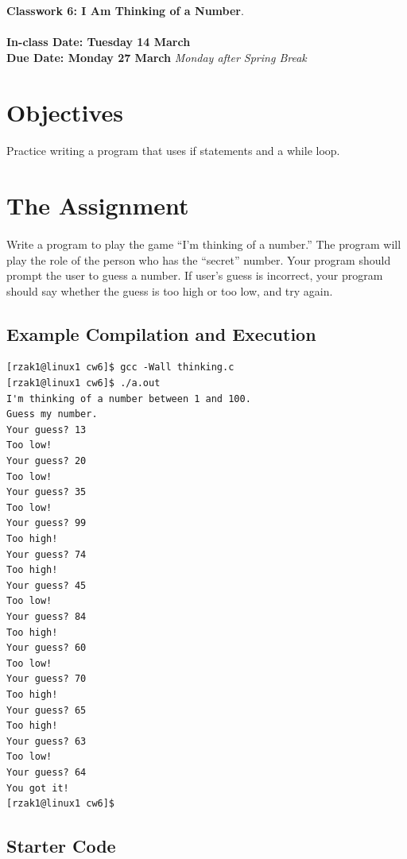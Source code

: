 \documentclass[letter,11pt]{article}
\begin{document}
\huge
\textbf{Classwork 6: I Am Thinking of a Number}.
\normalsize
\\ ~~ \\
\textbf{In-class Date: Tuesday 14 March} \\
\textbf{Due Date: Monday 27 March} \textit{Monday after Spring Break}

\section*{Objectives}
\paragraph{}Practice writing a program that uses if statements and a while loop.

\section*{The Assignment}
\paragraph{}Write a program to play the game ``I'm thinking of a number.'' The program will play the role of the person who has the ``secret'' number. Your program should prompt the user to guess a number. If user's guess is incorrect, your program should say whether the guess is too high or too low, and try again.

\subsection*{Example Compilation and Execution}
\begin{verbatim}
[rzak1@linux1 cw6]$ gcc -Wall thinking.c
[rzak1@linux1 cw6]$ ./a.out
I'm thinking of a number between 1 and 100.
Guess my number.
Your guess? 13
Too low!
Your guess? 20
Too low!
Your guess? 35
Too low!
Your guess? 99
Too high!
Your guess? 74
Too high!
Your guess? 45
Too low!
Your guess? 84
Too high!
Your guess? 60
Too low!
Your guess? 70
Too high!
Your guess? 65
Too high!
Your guess? 63
Too low!
Your guess? 64
You got it!
[rzak1@linux1 cw6]$ 
\end{verbatim}

\subsection*{Starter Code}
\end{document}
